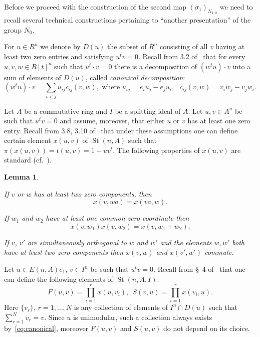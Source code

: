 \documentclass[oneside, 10pt]{amsart}
\DeclareMathOperator{\St}{St}
\numberwithin{equation}{section}
\newtheorem{lemma}{Lemma}
\numberwithin{lemma}{section}
\theoremstyle{definition}
\theoremstyle{remark}
\begin{document}
Before we proceed with the construction of the second map $(\sigma_1)_{N_{1,0}}$ we need to recall several technical
 constructions pertaining to ``another presentation'' of the group $N_{0}$.

For $u \in R^n$ we denote by $D(u)$ the subset of $R^n$ consisting of all $v$ having at least two zero entries and satisfying $u^tv = 0$.
Recall from 3.2 of~\cite{Ka77} that for every $u, v, w \in R[t]^n$ such that $u^t \cdot v = 0$ there
 is a decomposition of $(w^t u) \cdot v$ into a sum of elements of $D(u)$, called {\it canonical decomposition}:
\setcounter{equation}{1}
\renewcommand{\theequation}{\arabic{equation}}
\begin{equation} \label{eq:canonical} (w^tu) \cdot v=\sum_{i<j}u_{ij} c_{ij}(v, w),\text{ where $u_{ij}=e_iu_j-e_ju_i,$ $c_{ij}(v, w)=v_iw_j-v_jw_i.$}\end{equation}

Let $A$ be a commutative ring and $I$ be a splitting ideal of $A$.
Let $u, v \in A^n$ be such that $u^t v = 0$ and assume, moreover, that either $u$ or $v$ has at least one zero entry.
Recall from 3.8, 3.10 of~\cite{Ka77} that under these assumptions one can define certain element
 $x(u, v)$ of $\St(n, A)$ such that $\pi(x(u, v)) = t(u, v) = 1 + uv^t$.
The following properties of $x(u, v)$ are standard (cf.~\cite[Lemma~1.1]{Tu83}).
\begin{lemma} \label{lem:xsmall-properties}
\begin{lemlist}
 \item \label{item:xsmall-scalar} If $v$ or $w$ has at least two zero components, then 
 \begin{equation}\nonumber x(v, wa) = x(va, w).\end{equation}
 \item \label{item:xsmall-additivity} If $w_1$ and $w_2$ have at least one common zero coordinate then
 \begin{equation}\nonumber x(v, w_1)x(v, w_2) = x(v, w_1+w_2).\end{equation}
 \item \label{item:xsmall-commute} If $v$, $v'$ are simultaneously orthogonal to $w$ and $w'$ and the elements $w, w'$
  both have at least two zero components then $x(v, w)$ and $x(v', w')$ commute.
\end{lemlist}
\end{lemma}

Let $u \in E(n, A)e_1$, $v \in I^n$ be such that $u^tv = 0$.
Recall from \S~4 of~\cite{LS17} that one can define the following elements of $\St(n, A, I)$:
\begin{equation} \label{eq:sigma-definition}
 F(u, v) = \prod\limits_{i=1}^r x(u,  v_i),\ \
 S(v, u) = \prod\limits_{i=1}^r x( v_i, u).
\end{equation}
Here $\{v_r\}$, $r=1,\ldots,N$ is any collection of elements of $I^n \cap D(u)$ such that $\sum_{r=1}^N v_r = v$.
Since $u$ is unimodular, such a collection always exists by~\eqref{eq:canonical}, moreover
 $F(u, v)$ and $S(u, v)$ do not depend on its choice. %
\end{document}
